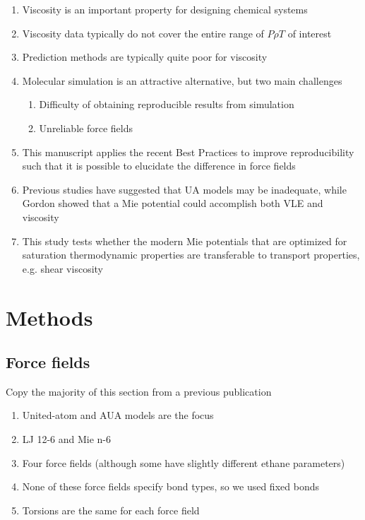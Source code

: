 \documentclass[11pt,a4paper]{article}
\begin{document}
\begin{enumerate}
	\item Viscosity is an important property for designing chemical systems
	\item Viscosity data typically do not cover the entire range of $P \rho T$ of interest
	\item Prediction methods are typically quite poor for viscosity
	\item Molecular simulation is an attractive alternative, but two main challenges
	\begin{enumerate}
		\item Difficulty of obtaining reproducible results from simulation
		\item Unreliable force fields
	\end{enumerate}
    \item This manuscript applies the recent Best Practices to improve reproducibility such that it is possible to elucidate the difference in force fields
    \item Previous studies have suggested that UA models may be inadequate, while Gordon showed that a Mie potential could accomplish both VLE and viscosity
    \item This study tests whether the modern Mie potentials that are optimized for saturation thermodynamic properties are transferable to transport properties, e.g. shear viscosity
\end{enumerate}

\section{Methods}

\subsection{Force fields}

Copy the majority of this section from a previous publication

\begin{enumerate}
	\item United-atom and AUA models are the focus
	\item LJ 12-6 and Mie n-6
	\item Four force fields (although some have slightly different ethane parameters)
	\item None of these force fields specify bond types, so we used fixed bonds
	\item Torsions are the same for each force field
\end{enumerate}
\end{document}
